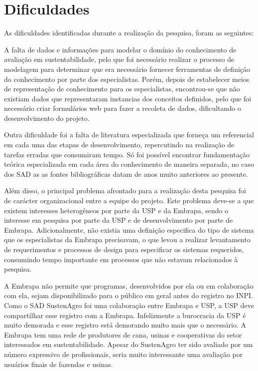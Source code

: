 \section{Dificuldades }

As dificuldades identificadas durante a realização da pesquisa, foram
as seguintes:

A falta de dados e informações para modelar o domínio do conhecimento
de avaliação em sustentabilidade, pelo que foi necessário realizar
o processo de modelagem para determinar que era necessário fornecer
ferramentas de definição do conhecimento por parte dos especialistas.
Porém, depois de estabelecer meios de representação de conhecimento
para os especialistas, encontrou-se que não existiam dados que representaram
instancias dos conceitos definidos, pelo que foi necessário criar
formulários web para fazer a recoleta de dados, dificultando o desenvolvimento
do projeto.

Outra dificuldade foi a falta de literatura especializada que forneça
um referencial em cada uma das etapas de desenvolvimento, repercutindo
na realização de tarefas erradas que consumiram tempo. Só foi possível
encontrar fundamentação teórica especializada em cada área do conhecimento
de maneira separada, no caso dos SAD as as fontes bibliográficas datam
de anos muito anteriores ao presente.

Além disso, o principal problema afrontado para a realização desta
pesquisa foi de carácter organizacional entre a equipe do projeto.
Este problema deve-se a que existem interesses heterogêneos por parte
da USP e da Embrapa, sendo o interesse em pesquisa por parte da USP
e de desenvolvimento por parte de Embrapa. Adicionalmente, não existia
uma definição especifica do tipo de sistema que os especialistas da
Embrapa precisavam, o que levou a realizar levantamento de requerimentos
e processos de design para especificar os sistemas requeridos, consumindo
tempo importante em processos que não estavam relacionados à pesquisa.

A Embrapa não permite que programas, desenvolvidos por ela ou em colaboração
com ela, sejam disponibilizado para o público em geral antes do registro
no INPI. Como o SAD SustenAgro foi uma colaboração entre Embrapa e
USP, a USP deve compartilhar esse registro com a Embrapa. Infelizmente
a burocracia da USP é muito demorada e esse registro está demorando
muito mais que o necessário. A Embrapa tem uma rede de produtores
de cana, usinas e cooperativas do setor interessados em sustentabilidade.
Apesar do SustenAgro ter sido avaliado por um número expressivo de
profissionais, seria muito interessante uma avaliação por usuários
finais de fazendas e usinas.

